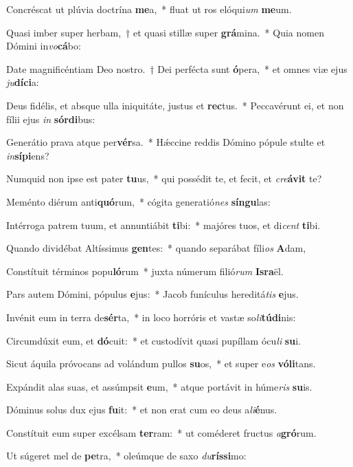 \item Concréscat ut plúvia doctrína \textbf{me}a,~* fluat ut ros elóqui\textit{um} \textbf{me}um.
\item Quasi imber super herbam,~† et quasi stillæ super \textbf{grá}mina.~* Quia nomen Dómini in\textit{vo}\textbf{cá}bo:
\item Date magnificéntiam Deo nostro.~† Dei perfécta sunt \textbf{ó}pera,~* et omnes viæ ejus \textit{ju}\textbf{dí}\textbf{ci}a:
\item Deus fidélis, et absque ulla iniquitáte, justus et \textbf{rec}tus.~* Peccavérunt ei, et non fílii ejus \textit{in} \textbf{sór}\textbf{di}bus:
\item Generátio prava atque per\textbf{vér}sa.~* Hǽccine reddis Dómino pópule stulte et \textit{in}\textbf{sí}\textbf{pi}ens?
\item Numquid non ipse est pater \textbf{tu}us,~* qui possédit te, et fecit, et \textit{cre}\textbf{á}\textbf{vit} te?
\item Meménto diérum anti\textbf{quó}rum,~* cógita generatió\textit{nes} \textbf{sín}\textbf{gu}las:
\item Intérroga patrem tuum, et annuntiábit \textbf{ti}bi:~* majóres tuos, et di\textit{cent} \textbf{ti}bi.
\item Quando dividébat Altíssimus \textbf{gen}tes:~* quando separábat fíli\textit{os} \textbf{A}dam,
\item Constítuit términos popu\textbf{ló}rum~* juxta númerum filió\textit{rum} \textbf{Is}\textbf{ra}ël.
\item Pars autem Dómini, pópulus \textbf{e}jus:~* Jacob funículus hereditá\textit{tis} \textbf{e}jus.
\item Invénit eum in terra de\textbf{sér}ta,~* in loco horróris et vastæ so\textit{li}\textbf{tú}\textbf{di}nis:
\item Circumdúxit eum, et \textbf{dó}cuit:~* et custodívit quasi pupíllam ócu\textit{li} \textbf{su}i.
\item Sicut áquila próvocans ad volándum pullos \textbf{su}os,~* et super e\textit{os} \textbf{vó}\textbf{li}tans.
\item Expándit alas suas, et assúmpsit \textbf{e}um,~* atque portávit in húme\textit{ris} \textbf{su}is.
\item Dóminus solus dux ejus \textbf{fu}it:~* et non erat cum eo deus a\textit{li}\textbf{é}nus.
\item Constítuit eum super excélsam \textbf{ter}ram:~* ut coméderet fructus \textit{a}\textbf{gró}rum.
\item Ut súgeret mel de \textbf{pe}tra,~* oleúmque de saxo \textit{du}\textbf{rís}\textbf{si}mo:
